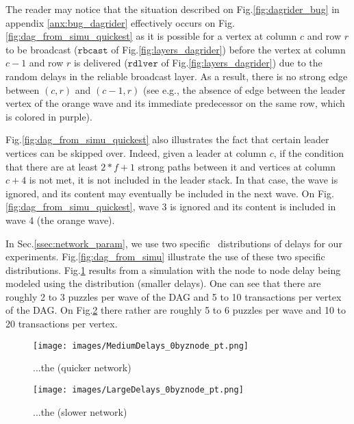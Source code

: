 The reader may notice that the situation described on Fig.\ref{fig:dagrider_bug} in appendix \ref{anx:bug_dagrider} effectively occurs on Fig.\ref{fig:dag_from_simu_quickest} as it is possible for a vertex at column $c$ and row $r$ to be broadcast ($\mathtt{rbcast}$ of Fig.\ref{fig:layers_dagrider}) before the vertex at column $c-1$ and row $r$ is delivered ($\mathtt{rdlver}$ of Fig.\ref{fig:layers_dagrider}) due to the random delays in the reliable broadcast layer. As a result, there is no strong edge between $(c,r)$ and $(c-1,r)$ (see e.g., the absence of edge between the leader vertex of the orange wave and its immediate predecessor on the same row, which is colored in purple).

Fig.\ref{fig:dag_from_simu_quickest} also illustrates the fact that certain leader vertices can be skipped over.
Indeed, given a leader at column $c$, if the condition that there are at least $2*f+1$ strong paths between it and vertices at column $c + 4$ is not met, it is not included in the leader stack.
In that case, the wave is ignored, and its content may eventually be included in the next wave.
On Fig.\ref{fig:dag_from_simu_quickest}, wave 3 is ignored and its content is included in wave 4 (the orange wave).



In Sec.\ref{ssec:network_param}, we use two specific \faClockO~distributions of delays for our experiments.
Fig.\ref{fig:dag_from_simu} illustrate the use of these two specific distributions.
Fig.\ref{fig:dag_from_simu_quick} results from a simulation with the node to node delay being modeled using the \textcolor{blue}{\faClockO} distribution (smaller delays).
One can see that there are roughly 2 to 3 puzzles per wave of the DAG and 5 to 10 transactions per vertex of the DAG.
On Fig.\ref{fig:dag_from_simu_slow} there rather are roughly 5 to 6 puzzles per wave and 10 to 20 transactions per vertex.


\begin{figure*}
    \centering

\begin{minipage}{.65\textwidth}
    
    \begin{subfigure}{\textwidth}
        \texttt{[image: images/MediumDelays\_0byznode\_pt.png]}
        \caption{...the \textcolor{blue}{\faClockO} (quicker network)}
        \label{fig:dag_from_simu_quick}
    \end{subfigure}
    
\end{minipage}
%
\begin{minipage}{.325\textwidth}
    \begin{subfigure}{\textwidth}
        \texttt{[image: images/LargeDelays\_0byznode\_pt.png]}
        \caption{...the \textcolor{green}{\faClockO} (slower network)}
        \label{fig:dag_from_simu_slow}
    \end{subfigure}
\end{minipage}
    
    \caption{DAG content excerpts at the end of a $n=4$ simulation with ...}
    \label{fig:dag_from_simu}
\end{figure*}



